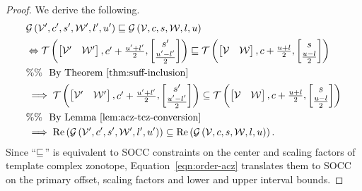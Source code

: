 %
\begin{proof}
  We derive the following.
  \begin{align*}
&    \mathcal{G}\left(\mathcal{V}^\prime,c^\prime,s^\prime,\mathcal{W}^\prime,l^\prime,u^\prime\right)\sqsubseteq\mathcal{G}\left(\mathcal{V},c,s,\mathcal{W},l,u\right)\\
& \Leftrightarrow   \mathit{\operatorname{\mathcal{T}}}\left(\left[\begin{matrix}
      \mathcal{V}^\prime &
      \mathcal{W}^\prime
    \end{matrix}\right]
  ,\begin{matrix}
      c^\prime+\frac{u^\prime+l^\prime}{2}
    \end{matrix}
  ,\left[\begin{matrix}
      s^\prime\\
      \frac{u^\prime-l^\prime}{2}
    \end{matrix}\right]
  \right)  
  \sqsubseteq
  \mathit{\operatorname{\mathcal{T}}}\left(\left[\begin{matrix}
      \mathcal{V} &
      \mathcal{W}
    \end{matrix}\right]
  ,\begin{matrix}
      c+\frac{u+l}{2}
    \end{matrix}
  ,\left[\begin{matrix}
      s\\
      \frac{u-l}{2}
    \end{matrix}\right]
  \right)\\
  & \%\%~~\text{By Theorem~\ref{thm:suff-inclusion}}\\
  & \implies
  \mathit{\operatorname{\mathcal{T}}}\left(\left[\begin{matrix}
      \mathcal{V}^\prime &
      \mathcal{W}^\prime
    \end{matrix}\right]
  ,\begin{matrix}
      c^\prime+\frac{u^\prime+l^\prime}{2}
    \end{matrix}
  ,\left[\begin{matrix}
      s^\prime\\
      \frac{u^\prime-l^\prime}{2}
    \end{matrix}\right]
  \right)  
  \subseteq
  \mathit{\operatorname{\mathcal{T}}}\left(\left[\begin{matrix}
      \mathcal{V} &
      \mathcal{W}
    \end{matrix}\right]
  ,\begin{matrix}
      c+\frac{u+l}{2}
    \end{matrix}
  ,\left[\begin{matrix}
      s\\
      \frac{u-l}{2}
    \end{matrix}\right]
  \right)\\
  & \%\%~~\text{By Lemma~\ref{lem:acz-tcz-conversion}}\\
&\implies
  \operatorname{Re}\left(\mathcal{G}\left(\mathcal{V}^\prime,c^\prime,s^\prime,\mathcal{W}^\prime,l^\prime,u^\prime\right)\right)\subseteq\operatorname{Re}\left(\mathcal{G}\left(\mathcal{V},c,s,\mathcal{W},l,u\right)\right).
  \end{align*}
Since ``$\sqsubseteq$'' is equivalent to SOCC constraints on the center and scaling factors of template complex zonotope,
Equation~\ref{eqn:order-acz} translates them to SOCC on the primary offset, scaling factors and lower and upper interval bounds.
\end{proof}
